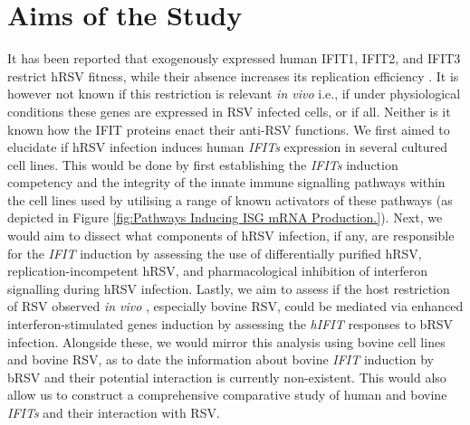 \section{Aims of the Study} \label{sec:Aims}
It has been reported that exogenously expressed human IFIT1, IFIT2, and IFIT3 restrict hRSV fitness, while their absence increases its replication efficiency \cite{Drori2020InfluenzaProteins}. It is however not known if this restriction is relevant \textit{in vivo} i.e., if under physiological conditions these genes are expressed in RSV infected cells, or if all. Neither is it known how the IFIT proteins enact their anti-RSV functions. We first aimed to elucidate if hRSV infection induces human \textit{IFITs} expression in several cultured cell lines. This would be done by first establishing the \textit{IFITs} induction competency and the integrity of the innate immune signalling pathways within the cell lines used by utilising a range of known activators of these pathways (as depicted in Figure \ref{fig:Pathways Inducing ISG mRNA Production.}). Next, we would aim to dissect what components of hRSV infection, if any, are responsible for the \textit{IFIT} induction by assessing the use of differentially purified hRSV, replication-incompetent hRSV, and pharmacological inhibition of interferon signalling during hRSV infection. Lastly, we aim to assess if the host restriction of RSV observed \textit{in vivo} \cite{Nair2013GlobalAnalysis, Sacco2014RespiratoryCattle}, especially bovine RSV, could be mediated via enhanced interferon-stimulated genes induction by assessing the \textit{hIFIT} responses to bRSV infection. Alongside these, we would mirror this analysis using bovine cell lines and bovine RSV, as to date the information about bovine \textit{IFIT} induction by bRSV and their potential interaction is currently non-existent. This would also allow us to construct a comprehensive comparative study of human and bovine \textit{IFITs} and their interaction with RSV.

